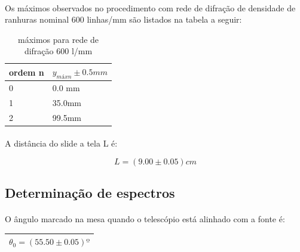 \documentclass[a4paper,11pt]{article}
\begin{document}
\paragraph{}Os máximos observados no procedimento com rede de difração
de densidade de ranhuras nominal 600 linhas/mm são listados na tabela a seguir:
\begin{table}[!htp]
    \centering
    	\begin{tabular}{|l|l|}\hline
   		ordem n & $y_{máx n} \pm 0.5mm$ \\ \hline
		0	& 0.0 mm  \\ \hline
		1	& 35.0mm\\ \hline
		2	& 99.5mm\\ \hline
	\end{tabular}
  \caption{máximos para rede de difração 600 l/mm}
\label{tab:rede}
\end{table}

\paragraph{} A distância do slide a tela L é:

\begin{displaymath}
	L = (9.00 \pm 0.05) cm
\end{displaymath}


\subsection{Determinação de espectros}
\paragraph{} O ângulo marcado na mesa quando o telescópio está alinhado
com a fonte é:
\begin{center}
  \begin{tabular}{|l|}\hline
      $\theta _0 = (55.50 \pm 0.05)º$
      \\ \hline
  \end{tabular}
\end{center}
\end{document}
